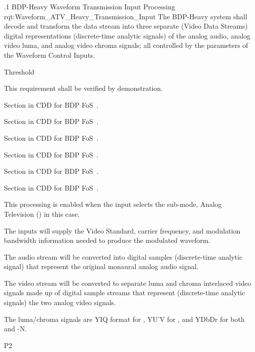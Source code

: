 \ONERQMTVKPP
{\RqtNumberBase.1}
{BDP-Heavy \ATV Waveform Transmission Input Processing}
{rqt:Waveform_ATV_Heavy_Transmission_Input}
{The BDP-Heavy system shall decode and transform the \MPEGTS data stream into three separate (Video Data Streams) digital representations (discrete-time analytic signals) of the analog audio, analog video luma, and analog video chroma signals; all controlled by the parameters of the Waveform Control Inputs.}
{
	\item [Phase 1]  Threshold
}
{This requirement shall be verified by demonstration.}
{
	\item [5.1.1] Section in CDD for BDP FoS~\cite{ref__BDP_FOS_CDD}.
	\item [5.1.2] Section in CDD for BDP FoS~\cite{ref__BDP_FOS_CDD}.
	\item [5.5.1] Section in CDD for BDP FoS~\cite{ref__BDP_FOS_CDD}.
	\item [5.5.2] Section in CDD for BDP FoS~\cite{ref__BDP_FOS_CDD}.
	\item [5.5.3] Section in CDD for BDP FoS~\cite{ref__BDP_FOS_CDD}.
	\item [5.5.4] Section in CDD for BDP FoS~\cite{ref__BDP_FOS_CDD}.
}
{
	\item This processing is enabled when the input selects the sub-mode, Analog Television (\ATV) in this case.
	\item The inputs will supply the \ATV Video Standard, \RF carrier frequency, and modulation bandwidth information needed to produce the modulated \RF waveform.
	\item The audio stream will be converted into digital samples (discrete-time analytic signal) that represent the original monaural analog audio signal.
	\item The \MPEG video stream will be converted to separate luma and chroma interlaced video signals made up of digital sample streams that represent (discrete-time analytic signals) the two analog video signals.
	\item The luma/chroma signals are YIQ format for \NTSC, YU’V for \PAL, and YDbDr for both \SECAM and \PAL-N.
}
{P2}

